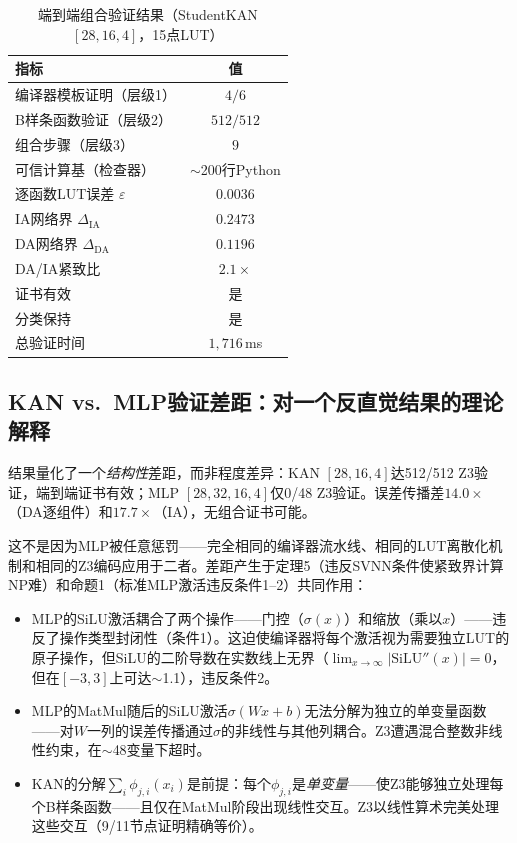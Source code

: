 \documentclass[journal,onecolumn]{IEEEtran}
\theoremstyle{definition}
\theoremstyle{plain}
\theoremstyle{remark}
\begin{document}
\begin{table}[!t]
\centering
\caption{端到端组合验证结果（StudentKAN $[28,16,4]$，15点LUT）}
\label{tab:compositional}
\small
\begin{tabular}{@{}lc@{}}
\toprule
\textbf{指标} & \textbf{值} \\
\midrule
  编译器模板证明（层级1）          & $4/6$ \\
  B样条函数验证（层级2）           & $512/512$ \\
  组合步骤（层级3）                & $9$ \\
  可信计算基（检查器）             & $\sim$200行Python \\
\midrule
  逐函数LUT误差 $\varepsilon$      & $0.0036$ \\
  IA网络界 $\Delta_{\text{IA}}$    & $0.2473$ \\
  DA网络界 $\Delta_{\text{DA}}$    & $0.1196$ \\
  DA/IA紧致比                      & $2.1\times$ \\
\midrule
  证书有效                         & 是 \\
  分类保持                         & 是 \\
  总验证时间                       & $1{,}716$\,ms \\
\bottomrule
\end{tabular}
\end{table}

\subsection{KAN vs.\ MLP验证差距：对一个反直觉结果的理论解释}
\label{sec:verify_gap}

结果量化了一个\textit{结构性}差距，而非程度差异：KAN $[28,16,4]$达512/512 Z3验证，端到端证书有效；MLP $[28,32,16,4]$仅0/48 Z3验证。误差传播差$14.0\times$（DA逐组件）和$17.7\times$（IA），无组合证书可能。

这不是因为MLP被任意惩罚——完全相同的编译器流水线、相同的LUT离散化机制和相同的Z3编码应用于二者。差距产生于定理5（违反SVNN条件使紧致界计算NP难）和命题1（标准MLP激活违反条件1--2）共同作用：

\begin{itemize}
    \item MLP的SiLU激活耦合了两个操作——门控（$\sigma(x)$）和缩放（乘以$x$）——违反了操作类型封闭性（条件1）。这迫使编译器将每个激活视为需要独立LUT的原子操作，但SiLU的二阶导数在实数线上无界（$\lim_{x\to\infty}|\text{SiLU}''(x)| = 0$，但在$[-3,3]$上可达$\sim$1.1），违反条件2。
    \item MLP的MatMul随后的SiLU激活$\sigma(Wx+b)$无法分解为独立的单变量函数——对$W$一列的误差传播通过$\sigma$的非线性与其他列耦合。Z3遭遇混合整数非线性约束，在$\sim$48变量下超时。
    \item KAN的分解$\sum_i \phi_{j,i}(x_i)$是前提：每个$\phi_{j,i}$是\textit{单变量}——使Z3能够独立处理每个B样条函数——且仅在MatMul阶段出现线性交互。Z3以线性算术完美处理这些交互（9/11节点证明精确等价）。
\end{itemize}
\end{document}
